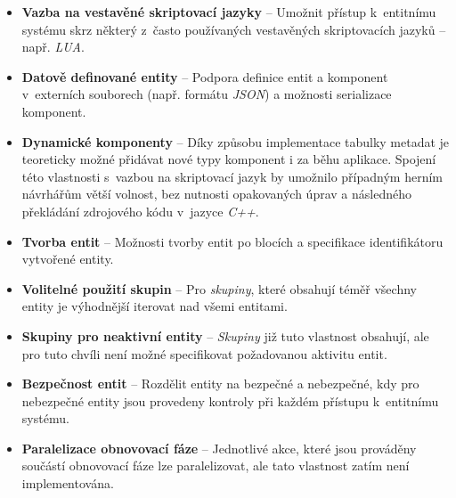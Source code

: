 \begin{itemize}
	\item \textbf{Vazba na vestavěné skriptovací jazyky} -- Umožnit přístup k~entitnímu systému skrz některý z~často používaných vestavěných skriptovacích jazyků -- např. \emph{LUA}. 
	\item \textbf{Datově definované entity} -- Podpora definice entit a komponent v~externích souborech (např. formátu \emph{JSON}) a možnosti serializace komponent.
	\item \textbf{Dynamické komponenty} -- Díky způsobu implementace tabulky metadat je teoreticky možné přidávat nové typy komponent i za běhu aplikace. Spojení této vlastnosti s~vazbou na skriptovací jazyk by umožnilo případným herním návrhářům větší volnost, bez nutnosti opakovaných úprav a následného překládání zdrojového kódu v~jazyce \emph{C++}.
	\item \textbf{Tvorba entit} -- Možnosti tvorby entit po blocích a specifikace identifikátoru vytvořené entity.
	\item \textbf{Volitelné použití skupin} -- Pro \emph{skupiny}, které obsahují téměř všechny entity je výhodnější iterovat nad všemi entitami. 
	\item \textbf{Skupiny pro neaktivní entity} -- \emph{Skupiny} již tuto vlastnost obsahují, ale pro tuto chvíli není možné specifikovat požadovanou aktivitu entit.
	\item \textbf{Bezpečnost entit} -- Rozdělit entity na bezpečné a nebezpečné, kdy pro nebezpečné entity jsou provedeny kontroly při každém přístupu k~entitnímu systému.
	\item \textbf{Paralelizace obnovovací fáze} -- Jednotlivé akce, které jsou prováděny součástí obnovovací fáze lze paralelizovat, ale tato vlastnost zatím není implementována.
\end{itemize}





